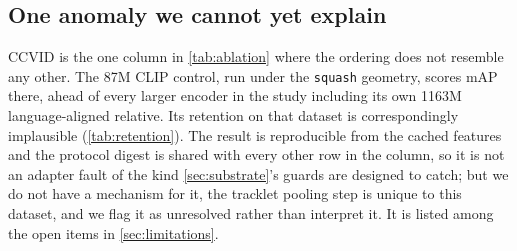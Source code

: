 \subsection{One anomaly we cannot yet explain}
CCVID is the one column in \cref{tab:ablation} where the ordering does not resemble any other.
The 87M CLIP control, run under the \texttt{squash} geometry, scores \clipCcvid{} mAP
there, ahead of every larger encoder in the study including its own 1163M
language-aligned relative. Its retention on that dataset is correspondingly implausible
(\cref{tab:retention}). The result is reproducible from the cached features and the protocol
digest is shared with every other row in the column, so it is not an adapter fault of the kind
\cref{sec:substrate}'s guards are designed to catch; but we do not have a mechanism for it, the
tracklet pooling step is unique to this dataset, and we flag it as unresolved rather than
interpret it. It is listed among the open items in \cref{sec:limitations}.
